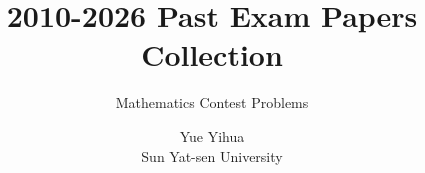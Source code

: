 \documentclass[
    fontsize=11pt, %
    twoside=false, %
    secnumdepth=2, %
    parskip=full-, %
    fontmethod=tex, %
]{kaobook}
\begin{document}

\title{2010-2026 Past Exam Papers Collection}
\subtitle{Mathematics Contest Problems}
\author{Yue Yihua\\Sun Yat-sen University}
\date{\the\year}


\frontmatter %

\thispagestyle{empty}
\end{document}
